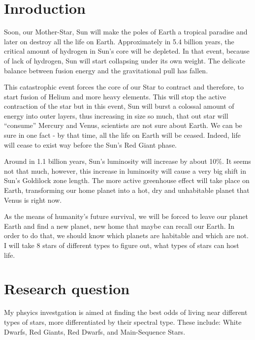 \documentclass[a4paper,10pt]{article}
\begin{document}



\section{Inroduction}

Soon, our Mother-Star, Sun will make the poles of Earth a tropical paradise and later on destroy all the life on Earth. Approximately in 5.4 billion years, the critical amount of hydrogen in Sun's core will be depleted. In that event, because of lack of hydrogen, Sun will start collapsing under its own weight. The delicate balance between fusion energy and the gravitational pull has fallen.

This catastrophic event forces the core of our Star to contract and therefore, to start fusion of Helium and more heavy elements. This will stop the active contraction of the star but in this event, Sun will burst a colossal amount of energy into outer layers, thus increasing in size so much, that out star will ``consume'' Mercury and Venus, scientists are not sure about Earth. We can be sure in one fact -  by that time, all the life on Earth will be ceased. Indeed, life will cease to exist way before the Sun's Red Giant phase.

Around in 1.1 billion years, Sun's luminosity will increase by about 10\%. It seems not that much, however, this increase in luminosity will cause a very big shift in Sun's Goldilock zone length. The more active greenhouse effect will take place on Earth, transforming our home planet into a hot, dry and unhabitable planet that Venus is right now.~\cite{sun}

As the means of humanity's future survival, we will be forced to leave our planet Earth and find a new planet, new home that maybe can recall our Earth. In order to do that, we should know which planets are habitable and which are not. I will take 8 stars of different types to figure out, what types of stars can host life.

\section{Research question}

My phsyics investgation is aimed at finding the best odds of living near different types of stars, more differentiated by their spectral type. These include: White Dwarfs, Red Giants, Red Dwarfs, and Main-Sequence Stars.\\
\end{document}
